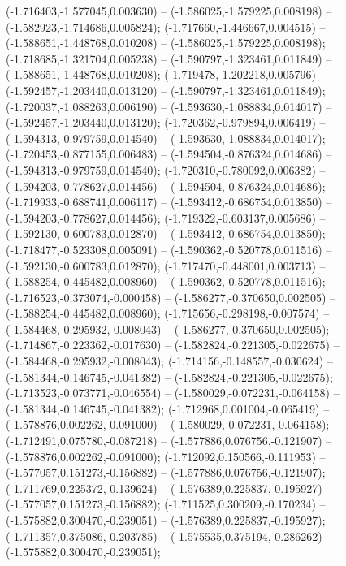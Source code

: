  (-1.716403,-1.577045,0.003630) -- (-1.586025,-1.579225,0.008198) -- (-1.582923,-1.714686,0.005824);
 (-1.717660,-1.446667,0.004515) -- (-1.588651,-1.448768,0.010208) -- (-1.586025,-1.579225,0.008198);
 (-1.718685,-1.321704,0.005238) -- (-1.590797,-1.323461,0.011849) -- (-1.588651,-1.448768,0.010208);
 (-1.719478,-1.202218,0.005796) -- (-1.592457,-1.203440,0.013120) -- (-1.590797,-1.323461,0.011849);
 (-1.720037,-1.088263,0.006190) -- (-1.593630,-1.088834,0.014017) -- (-1.592457,-1.203440,0.013120);
 (-1.720362,-0.979894,0.006419) -- (-1.594313,-0.979759,0.014540) -- (-1.593630,-1.088834,0.014017);
 (-1.720453,-0.877155,0.006483) -- (-1.594504,-0.876324,0.014686) -- (-1.594313,-0.979759,0.014540);
 (-1.720310,-0.780092,0.006382) -- (-1.594203,-0.778627,0.014456) -- (-1.594504,-0.876324,0.014686);
 (-1.719933,-0.688741,0.006117) -- (-1.593412,-0.686754,0.013850) -- (-1.594203,-0.778627,0.014456);
 (-1.719322,-0.603137,0.005686) -- (-1.592130,-0.600783,0.012870) -- (-1.593412,-0.686754,0.013850);
 (-1.718477,-0.523308,0.005091) -- (-1.590362,-0.520778,0.011516) -- (-1.592130,-0.600783,0.012870);
 (-1.717470,-0.448001,0.003713) -- (-1.588254,-0.445482,0.008960) -- (-1.590362,-0.520778,0.011516);
 (-1.716523,-0.373074,-0.000458) -- (-1.586277,-0.370650,0.002505) -- (-1.588254,-0.445482,0.008960);
 (-1.715656,-0.298198,-0.007574) -- (-1.584468,-0.295932,-0.008043) -- (-1.586277,-0.370650,0.002505);
 (-1.714867,-0.223362,-0.017630) -- (-1.582824,-0.221305,-0.022675) -- (-1.584468,-0.295932,-0.008043);
 (-1.714156,-0.148557,-0.030624) -- (-1.581344,-0.146745,-0.041382) -- (-1.582824,-0.221305,-0.022675);
 (-1.713523,-0.073771,-0.046554) -- (-1.580029,-0.072231,-0.064158) -- (-1.581344,-0.146745,-0.041382);
 (-1.712968,0.001004,-0.065419) -- (-1.578876,0.002262,-0.091000) -- (-1.580029,-0.072231,-0.064158);
 (-1.712491,0.075780,-0.087218) -- (-1.577886,0.076756,-0.121907) -- (-1.578876,0.002262,-0.091000);
 (-1.712092,0.150566,-0.111953) -- (-1.577057,0.151273,-0.156882) -- (-1.577886,0.076756,-0.121907);
 (-1.711769,0.225372,-0.139624) -- (-1.576389,0.225837,-0.195927) -- (-1.577057,0.151273,-0.156882);
 (-1.711525,0.300209,-0.170234) -- (-1.575882,0.300470,-0.239051) -- (-1.576389,0.225837,-0.195927);
 (-1.711357,0.375086,-0.203785) -- (-1.575535,0.375194,-0.286262) -- (-1.575882,0.300470,-0.239051);
